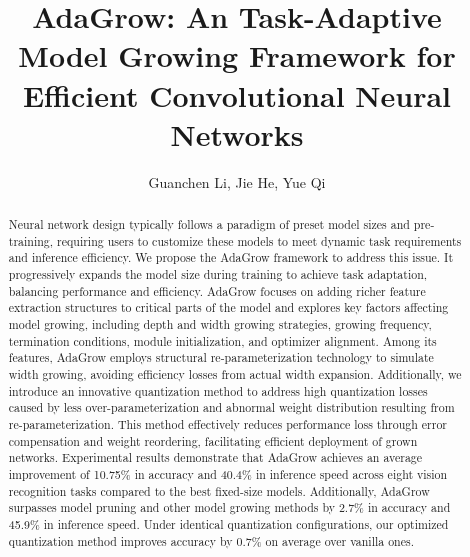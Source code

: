 \documentclass[preprint,12pt]{elsarticle}
\begin{document}
\begin{frontmatter}

\title{AdaGrow: An Task-Adaptive Model Growing Framework for Efficient Convolutional Neural Networks}

\author{Guanchen Li, Jie He, Yue Qi} 


\begin{abstract}
Neural network design typically follows a paradigm of preset model sizes and pre-training, requiring users to customize these models to meet dynamic task requirements and inference efficiency. We propose the AdaGrow framework to address this issue. It progressively expands the model size during training to achieve task adaptation, balancing performance and efficiency. AdaGrow focuses on adding richer feature extraction structures to critical parts of the model and explores key factors affecting model growing, including depth and width growing strategies, growing frequency, termination conditions, module initialization, and optimizer alignment. Among its features, AdaGrow employs structural re-parameterization technology to simulate width growing, avoiding efficiency losses from actual width expansion. Additionally, we introduce an innovative quantization method to address high quantization losses caused by less over-parameterization and abnormal weight distribution resulting from re-parameterization. This method effectively reduces performance loss through error compensation and weight reordering, facilitating efficient deployment of grown networks. Experimental results demonstrate that AdaGrow achieves an average improvement of 10.75\% in accuracy and 40.4\% in inference speed across eight vision recognition tasks compared to the best fixed-size models. Additionally, AdaGrow surpasses model pruning and other model growing methods by 2.7\% in accuracy and 45.9\% in inference speed. Under identical quantization configurations, our optimized quantization method improves accuracy by 0.7\% on average over vanilla ones.
\end{abstract}



\end{frontmatter}
\end{document}
